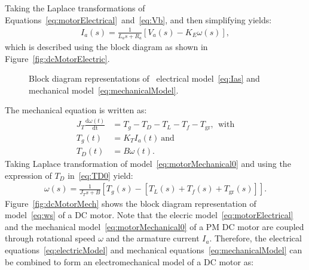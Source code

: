 %
Taking the Laplace transformations of Equations~\eqref{eq:motorElectrical}~and~\eqref{eq:Vb}, and then simplifying yields: %
%
\begin{align}
  \label{eq:Ias}
  I_a(s) =   \frac{1}{L_as +R_a}\left[V_a(s) - K_E\omega(s)\right],
\end{align}
%
which is described using the block diagram as shown in Figure~\ref{fig:dcMotorElectric}. %
%
\begin{figure}
  \centering
\caption{Block diagram representations of~ electrical model~\eqref{eq:Ias} and~ mechanical  model~\eqref{eq:mechanicalModel}.}
\end{figure}
%
The mechanical equation is written as: %
%
\begin{subequations}
  \label{eq:mechanicalModel}
 \begin{align} 
    \label{eq:motorMechanical0}
    J_T\frac{\mathrm{d}\omega(t)}{\mathrm{dt}} & = T_g - T_D-T_L-T_f-T_{\mathrm{gr}},~~\mathrm{with}\\
    \label{eq:Tg0}
   T_g(t) & = K_TI_a(t)~\mathrm{and}\\
   \label{eq:TD0}
   T_D(t) & = B\omega(t).
\end{align}  
\end{subequations}
%
Taking Laplace transformation of model~\eqref{eq:motorMechanical0} and using the expression of $T_D$ in~\eqref{eq:TD0} yield: %
%
\begin{align}
  \label{eq:ws}
  \omega(s) =   \frac{1}{J_Ts +B}\left[T_g(s) - \left[T_L(s) + T_f(s) +T_{\mathrm{gr}}(s)\right]\right].
\end{align}
%
Figure~\ref{fig:dcMotorMech} shows the block diagram representation of model~\eqref{eq:ws} of a DC motor. Note that the elecric model~\eqref{eq:motorElectrical} and the mechanical model~\eqref{eq:motorMechanical0} of a PM DC motor are coupled through rotational speed $\omega$ and the armature current $I_a.$ Therefore, the electrical equations~\eqref{eq:electricModel} and mechanical equations~\eqref{eq:mechanicalModel} can be combined to form an electromechanical model of a DC motor as: %
